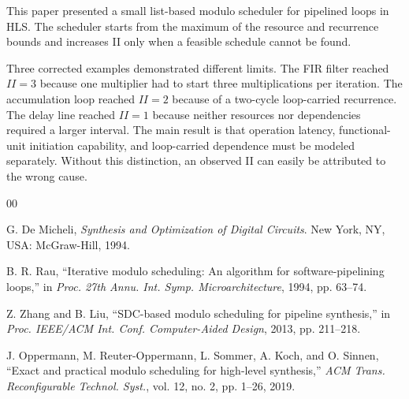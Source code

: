 \documentclass[conference]{IEEEtran}
\begin{document}
This paper presented a small list-based modulo scheduler for pipelined loops in
HLS. The scheduler starts from the maximum of the resource and recurrence bounds
and increases II only when a feasible schedule cannot be found.

Three corrected examples demonstrated different limits. The FIR filter reached
$II=3$ because one multiplier had to start three multiplications per iteration.
The accumulation loop reached $II=2$ because of a two-cycle loop-carried
recurrence. The delay line reached $II=1$ because neither resources nor
dependencies required a larger interval. The main result is that operation
latency, functional-unit initiation capability, and loop-carried dependence must
be modeled separately. Without this distinction, an observed II can easily be
attributed to the wrong cause.


\begin{thebibliography}{00}

G. De Micheli, \emph{Synthesis and Optimization of Digital Circuits}.
New York, NY, USA: McGraw-Hill, 1994.

B. R. Rau, ``Iterative modulo scheduling: An algorithm for software-pipelining
loops,'' in \emph{Proc. 27th Annu. Int. Symp. Microarchitecture}, 1994,
pp. 63--74.

Z. Zhang and B. Liu, ``SDC-based modulo scheduling for pipeline synthesis,''
in \emph{Proc. IEEE/ACM Int. Conf. Computer-Aided Design}, 2013,
pp. 211--218.

J. Oppermann, M. Reuter-Oppermann, L. Sommer, A. Koch, and O. Sinnen,
``Exact and practical modulo scheduling for high-level synthesis,''
\emph{ACM Trans. Reconfigurable Technol. Syst.}, vol. 12, no. 2,
pp. 1--26, 2019.

\end{thebibliography}
\end{document}
